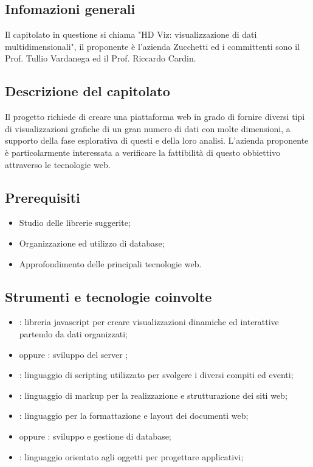 
\subsection{Infomazioni generali}
Il capitolato in questione si chiama "HD Viz: visualizzazione di dati multidimensionali", il proponente è l'azienda Zucchetti ed i committenti sono il Prof. Tullio Vardanega ed il Prof. Riccardo Cardin.

\subsection{Descrizione del capitolato}
Il progetto richiede di creare una piattaforma web in grado di fornire diversi tipi di visualizzazioni grafiche di un gran numero di dati con molte dimensioni, a supporto della fase esplorativa di questi e della loro analisi. 
L’azienda proponente è particolarmente interessata a verificare la fattibilità di questo obbiettivo attraverso le tecnologie web.

\subsection{Prerequisiti}
\begin{itemize}
\item Studio delle librerie suggerite;
\item Organizzazione ed utilizzo di database;
\item Approfondimento delle principali tecnologie web.
\end{itemize}

\subsection{Strumenti e tecnologie coinvolte}
\begin{itemize}
\item {}: libreria javascript per creare visualizzazioni dinamiche ed interattive partendo da dati organizzati;
\item {} oppure : sviluppo del server ;
\item {}: linguaggio di scripting utilizzato per svolgere i diversi compiti ed eventi;
\item {}: linguaggio di markup per la realizzazione e strutturazione dei siti web;
\item {}: linguaggio per la formattazione e layout dei documenti web;
\item {} oppure : sviluppo e gestione di database;
\item {}: linguaggio orientato agli oggetti per progettare applicativi;
\end{itemize}

